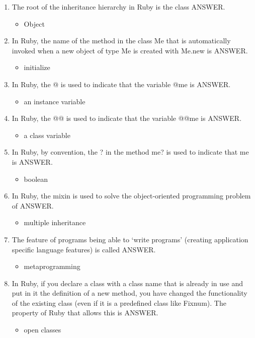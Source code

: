 \documentclass{exam}
\begin{document}
\begin{enumerate}
\begin{itemize}
\end{itemize}
\item The root of the inheritance hierarchy in Ruby is the class ANSWER.
\begin{itemize}
\item Object
\end{itemize}
\item In Ruby, the name of the method in the class Me that is automatically invoked when a new object of type Me is created with Me.new is ANSWER.
\begin{itemize}
\item initialize
\end{itemize}
\item In Ruby, the @ is used to indicate that the variable @me is ANSWER.
\begin{itemize}
\item an instance variable
\end{itemize}
\item In Ruby, the @@ is used to indicate that the variable @@me is ANSWER.
\begin{itemize}
\item a class variable
\end{itemize}
\item In Ruby, by convention, the ? in the method me? is used to indicate that me is ANSWER.
\begin{itemize}
\item boolean
\end{itemize}
\item In Ruby, the mixin is used to solve the object-oriented programming problem of ANSWER.
\begin{itemize}
\item multiple inheritance
\end{itemize}
\item The feature of programs being able to `write programs' (creating application specific language features) is called ANSWER.
\begin{itemize}
\item metaprogramming
\end{itemize}
\item In Ruby, if you declare a class with a class name that is already in use and put in it the definition of a new method, you have changed the functionality of the existing class (even if it is a predefined class like Fixnum).  The property of Ruby that allows this is ANSWER.
\begin{itemize}
\item open classes

\end{itemize}
\end{enumerate}
\end{document}

